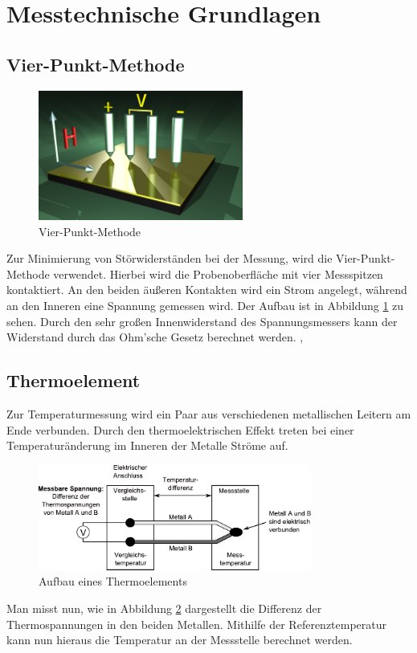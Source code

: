 	\section{Messtechnische Grundlagen}

		\subsection{Vier-Punkt-Methode}
\begin{figure}[h]
	\centering
	\includegraphics[width=0.6\textwidth]{Abb/vierpunkt.png}
	\caption{Vier-Punkt-Methode \cite{vierpunktwiki}}
	\label{Abb:vierpunkt}
\end{figure}
Zur Minimierung von Störwiderständen bei der Messung, wird die Vier-Punkt-Methode 
verwendet. Hierbei wird die Probenoberfläche mit vier Messspitzen kontaktiert. An
den beiden äußeren Kontakten wird ein Strom angelegt, während an den Inneren eine
Spannung gemessen wird. Der Aufbau ist in Abbildung \ref{Abb:vierpunkt} zu sehen.
Durch den sehr großen Innenwiderstand des Spannungsmessers kann der Widerstand
durch das Ohm'sche Gesetz berechnet werden. \cite{vierpunktwiki}, 
\cite{vierleiterwiki}

		\subsection{Thermoelement}
Zur Temperaturmessung wird ein Paar aus verschiedenen metallischen Leitern am Ende
verbunden. Durch den thermoelektrischen Effekt treten bei einer Temperaturänderung
im Inneren der Metalle Ströme auf.
\begin{figure}[h]
	\centering
	\includegraphics[width=0.8\textwidth]{Abb/thermo.pdf}
	\caption{Aufbau eines Thermoelements \cite{thermowiki}}
	\label{Abb:thermo}
\end{figure}
Man misst nun, wie in Abbildung \ref{Abb:thermo} dargestellt die Differenz der 
Thermospannungen in den beiden Metallen. Mithilfe der Referenztemperatur kann nun
hieraus die Temperatur an der Messstelle berechnet werden. \cite{thermowiki}

